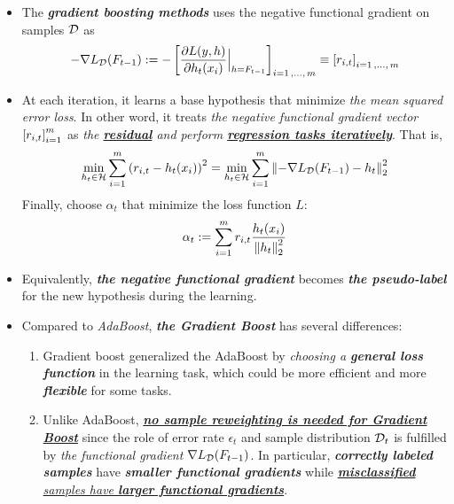 \documentclass[11pt]{article}
\begin{document}
\begin{itemize}
\item The \emph{\textbf{gradient boosting methods}} uses the negative functional gradient on samples ${\mathcal D}$ as  
\begin{align}
-\nabla L_{{\mathcal D}}(F_{t-1}) := -\left[\frac{\partial L(y, h)}{ \partial h_t(x_i)}\Bigr|_{h = F_{t-1}}\right]_{i=1\,{,}\ldots{,}\,m} \equiv \left[r_{i,t}\right]_{i=1\,{,}\ldots{,}\,m} \label{eqn: grad_boost}
\end{align} 

\item At each iteration, it learns a base hypothesis that minimize \emph{the mean squared error loss}. In other word, it treats \emph{the negative functional gradient vector} $\left[r_{i,t}\right]_{i=1}^{m}$ as \emph{the \underline{\textbf{residual}} and perform \underline{\textbf{regression tasks iteratively}}}. That is,
\begin{align}
\min_{h_t \in {\mathcal H}} \sum_{i=1}^{m}\left(r_{i,t} - h_t(x_i)\right)^2 = \min_{h_t \in {\mathcal H}} \sum_{i=1}^{m}\left\|-\nabla L_{{\mathcal D}}(F_{t-1}) - h_t\right\|_{2}^2 \label{eqn: grad_boost_regression_task}
\end{align}
Finally, choose $\alpha_t$ that minimize the loss function $L$:
\begin{align*}
\alpha_t := \sum_{i=1}^{m}r_{i,t} \frac{h_t(x_i)}{\left\|h_t\right\|_{2}^2}
\end{align*}

\item Equivalently,  \emph{\textbf{the negative functional gradient}} becomes \emph{\textbf{the pseudo-label}} for the new hypothesis during the learning. 

\item Compared to \emph{AdaBoost}, \emph{\textbf{the Gradient Boost}} has several differences:
\begin{enumerate}
\item Gradient boost generalized the AdaBoost by \emph{choosing a \textbf{general loss function}} in the learning task, which could be more efficient and more \emph{\textbf{flexible}} for some tasks. 

\item Unlike AdaBoost, \underline{\emph{\textbf{no sample reweighting is needed for Gradient Boost}}} since the role of error rate $\epsilon_t$ and sample distribution ${\mathcal D}_t$ is fulfilled by \emph{the functional gradient} $\nabla L_{{\mathcal D}}(F_{t-1})$. In particular, \emph{\textbf{correctly labeled samples}} have \emph{\textbf{smaller functional gradients}} while \emph{\underline{\textbf{misclassified} samples have \textbf{larger functional gradients}}}.


\end{enumerate}
\end{itemize}
\end{document}
